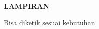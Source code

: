 \newpage %
\singlespacing
\begin{center}
\begin{large}\textbf{LAMPIRAN}\\\end{large}
\end{center}
\vspace{5mm}
Bisa diketik sesuai kebutuhan
